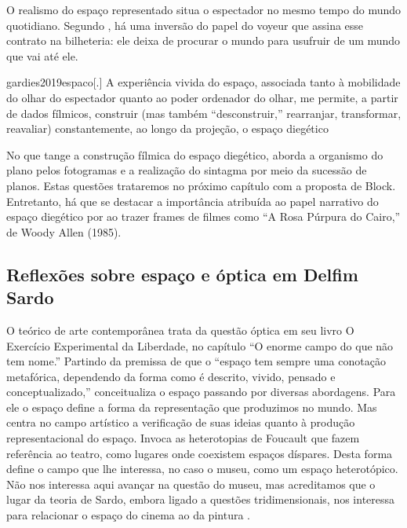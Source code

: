 O realismo do espaço representado situa o espectador no mesmo tempo do
mundo quotidiano. Segundo \textcite{gardies2019espaco}, há uma inversão
do papel do voyeur que assina esse contrato na bilheteria: ele deixa de
procurar o mundo para usufruir de um mundo que vai até ele.

\begin{displaycquote}[67]{gardies2019espaco}[.]
	A experiência vivida do espaço, associada tanto à mobilidade do olhar do
	espectador quanto ao poder ordenador do olhar, me permite, a partir de
	dados fílmicos, construir (mas também \enquote{desconstruir,} rearranjar,
	transformar, reavaliar) constantemente, ao longo da projeção, o espaço
  diegético
\end{displaycquote}

No que tange a construção fílmica do espaço diegético,
\parencite[89]{gardies2019espaco} aborda a organismo do plano pelos
fotogramas e a realização do sintagma por meio da sucessão de planos.
Estas questões trataremos no próximo capítulo com a proposta de Block.
Entretanto, há que se destacar a importância atribuída ao papel
narrativo do espaço diegético por \textcite{gardies2019espaco} ao
trazer frames de filmes como \enquote{A Rosa Púrpura do Cairo,} de
Woody Allen (1985).

\subsection{Reflexões sobre espaço e óptica em Delfim Sardo}%
\label{reflexoes-espaco-delfim-sardo}

O teórico de arte contemporânea \textcite{sardo2017exercicio} trata da
questão óptica em seu livro O Exercício Experimental da Liberdade, no
capítulo \enquote{O enorme campo do que não tem nome.} Partindo da
premissa de que o \enquote{espaço tem sempre uma conotação metafórica,
	dependendo da forma como é descrito, vivido, pensado e
	conceptualizado,} \textcite{sardo2017exercicio} conceitualiza o espaço
passando por diversas abordagens. Para ele o espaço define a forma da
representação que produzimos no mundo. Mas centra no campo artístico a
verificação de suas ideias quanto à produção representacional do
espaço. Invoca as heterotopias de Foucault que fazem referência ao
teatro, como lugares onde coexistem espaços díspares. Desta forma
define o campo que lhe interessa, no caso o museu, como um espaço
heterotópico. Não nos interessa aqui avançar na questão do museu, mas
acreditamos que o lugar da teoria de Sardo, embora ligado a questões
tridimensionais, nos interessa para relacionar o espaço do cinema ao da
pintura \parencite[189-189]{sardo2017exercicio}.

